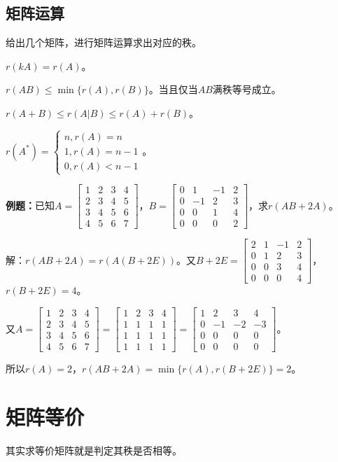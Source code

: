 \documentclass[UTF8, 12pt]{ctexart}
\begin{document}
\subsection{矩阵运算}

给出几个矩阵，进行矩阵运算求出对应的秩。

$r(kA)=r(A)$。

$r(AB)\leqslant\min\{r(A),r(B)\}$。当且仅当$AB$满秩等号成立。

$r(A+B)\leqslant r(A|B)\leqslant r(A)+r(B)$。

$r(A^*)=\left\{\begin{array}{l}
    n, r(A)=n \\
    1, r(A)=n-1 \\
    0, r(A)<n-1
\end{array}\right.$。

\textbf{例题：}已知$A=\left[\begin{array}{cccc}
    1 & 2 & 3 & 4 \\
    2 & 3 & 4 & 5 \\
    3 & 4 & 5 & 6 \\
    4 & 5 & 6 & 7
\end{array}\right]$，$B=\left[\begin{array}{cccc}
    0 & 1 & -1 & 2 \\
    0 & -1 & 2 & 3 \\
    0 & 0 & 1 & 4 \\
    0 & 0 & 0 & 2
\end{array}\right]$，求$r(AB+2A)$。

解：$r(AB+2A)=r(A(B+2E))$。又$B+2E=\left[\begin{array}{cccc}
    2 & 1 & -1 & 2 \\
    0 & 1 & 2 & 3 \\
    0 & 0 & 3 & 4 \\
    0 & 0 & 0 & 4
\end{array}\right]$，$r(B+2E)=4$。

又$A=\left[\begin{array}{cccc}
    1 & 2 & 3 & 4 \\
    2 & 3 & 4 & 5 \\
    3 & 4 & 5 & 6 \\
    4 & 5 & 6 & 7
\end{array}\right]=\left[\begin{array}{cccc}
    1 & 2 & 3 & 4 \\
    1 & 1 & 1 & 1 \\
    1 & 1 & 1 & 1 \\
    1 & 1 & 1 & 1
\end{array}\right]=\left[\begin{array}{cccc}
    1 & 2 & 3 & 4 \\
    0 & -1 & -2 & -3 \\
    0 & 0 & 0 & 0 \\
    0 & 0 & 0 & 0
\end{array}\right]$。\medskip

所以$r(A)=2$，$r(AB+2A)=\min\{r(A),r(B+2E)\}=2$。

\section{矩阵等价}

其实求等价矩阵就是判定其秩是否相等。
\end{document}
